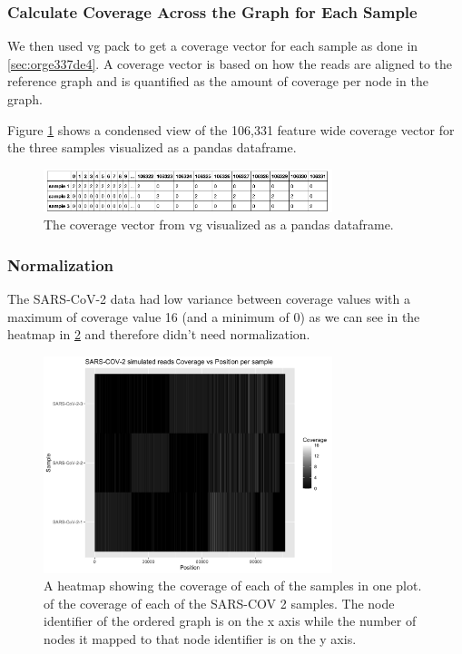 \documentclass[10pt, a4paper]{article}
\begin{document}
\subsubsection{Calculate Coverage Across the Graph for Each Sample}
\label{sec:org2448c10}
We then used vg pack to get a coverage vector for each sample as done in 
\ref{sec:orge337de4}.
A coverage vector is based on how the reads are aligned to the reference graph 
and is quantified as the amount of coverage per node in the graph.

Figure \ref{fig:org45773b6} shows a condensed view of the 106,331 feature
wide coverage vector for the three samples visualized as a pandas dataframe.

\begin{figure}[h]
\centering
\includegraphics[width=0.75\textwidth]{../Figures/SARS_CoV_2/SARS_Coverage_Vector.png}
\caption[SARS-CoV-2 Coverage Vector]{\label{fig:org45773b6}
The coverage vector from vg visualized as a pandas dataframe.}
\end{figure}

\subsubsection{Normalization}
\label{sec:org31b6010}
The SARS-CoV-2 data had low variance between coverage values with a maximum of 
coverage value 16 (and a minimum of 0) as we can see in the heatmap in
\ref{fig:org2b86385} and therefore didn’t need normalization.

\begin{figure}[h!]
\centering
\includegraphics[width=0.75\textwidth]{../Figures/SARS_CoV_2/Heatmap.png}
\caption[SARS-CoV-2 heatmap]{\label{fig:org2b86385}
A heatmap showing the coverage of each of the samples in one plot. of the coverage of each of the SARS-COV 2 samples. The node identifier of the ordered graph is on the x axis while the number of nodes it mapped to that node identifier is on the y axis.}
\end{figure}
\end{document}
